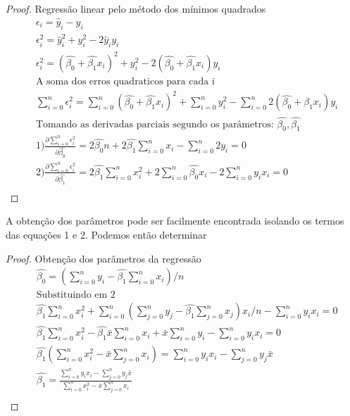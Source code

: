  \FloatBarrier 
 \begin{proof}
  	Regressão linear pelo método dos mínimos quadrados
  	\begin{align*}
  	&\epsilon_{i} =  \hat{y}_{i}-y_{i}  \\
  	&\epsilon_{i}^{2} = \hat{y}_{i}^{2} + y_{i}^{2} - 2\hat{y}_{i}y_{i}\\
  	&\epsilon_{i}^{2} = (\hat{\beta_{0}} + \hat{\beta_{1}}x_{i})^{2} + y_{i}^{2} - 2(\hat{\beta_{0}} + \hat{\beta_{1}}x_{i})y_{i}\\
  	&\text{A soma dos erros quadraticos para cada i} \\
  	&\sum_{i=0}^{n}\epsilon_{i}^{2} = \sum_{i=0}^{n}(\hat{\beta_{0}} + \hat{\beta_{1}}x_{i})^{2} + \sum_{i=0}^{n}y_{i}^{2} - \sum_{i=0}^{n}2(\hat{\beta_{0}} + \hat{\beta_{1}}x_{i})y_{i}\\
  	&\text{Tomando as derivadas parciais segundo os parâmetros: } \hat{\beta_{0}},\hat{\beta_{1}}\\
  	&1)\frac{\partial \sum_{i=0}^{n}\epsilon_{i}^{2}}{\partial \hat{\beta_{0}}} = 2\hat{\beta_{0}}n + 2\hat{\beta_{1}}\sum_{i=0}^{n}x_{i} - \sum_{i=0}^{n}2y_{i} = 0 \\
  	&2)\frac{\partial \sum_{i=0}^{n}\epsilon_{i}^{2}}{\partial \hat{\beta_{1}}} = 2\hat{\beta_{1}}\sum_{i=0}^{n}x_{i}^{2} + 2\sum_{i=0}^{n}\hat{\beta_{0}}x_{i} - 2\sum_{i=0}^{n}y_{i}x_{i} =0 \\
  	\end{align*}
  \end{proof}
 \FloatBarrier 
 
 
A obtenção dos parâmetros pode ser facilmente encontrada isolando os termos das equações 1 e 2. Podemos então determinar 

 \FloatBarrier 
\begin{proof}
 	Obtenção dos parâmetros da regressão
 	\begin{align*}
  	&\hat{\beta_{0}} = (\sum_{i=0}^{n}y_{i} - \hat{\beta_{1}}\sum_{i=0}^{n}x_{i})/n \\
  	&\text{Substituindo em 2}\\
  	&\hat{\beta_{1}}\sum_{i=0}^{n}x_{i}^{2} + \sum_{i=0}^{n}(\sum_{j=0}^{n}y_{j} - \hat{\beta_{1}}\sum_{j=0}^{n}x_{j})x_{i}/n - \sum_{i=0}^{n}y_{i}x_{i} =0 \\
  	&\hat{\beta_{1}}\sum_{i=0}^{n}x_{i}^{2} - \hat{\beta_{1}}\bar{x}\sum_{i=0}^{n}x_{i} + \bar{x}\sum_{i=0}^{n}y_{i} - \sum_{i=0}^{n}y_{i}x_{i} = 0  \\
  	&\hat{\beta_{1}}(\sum_{i=0}^{n}x_{i}^{2} - \bar{x}\sum_{j=0}^{n}x_{i}) = \sum_{i=0}^{n}y_{i}x_{i} - \sum_{j=0}^{n}y_{j}\bar{x}\\
  	&\hat{\beta_{1}} = \frac{\sum_{i=0}^{n}y_{i}x_{i} - \sum_{j=0}^{n}y_{j}\bar{x}}{\sum_{i=0}^{n}x_{i}^{2} - \bar{x}\sum_{j=0}^{n}x_{i}}\\
    \end{align*}
\end{proof}
 \FloatBarrier 
 
